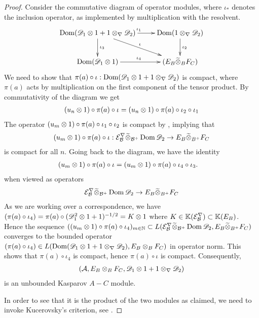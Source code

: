 \begin{proof}
	Consider the commutative diagram of operator modules, where $\iota_*$ denotes the inclusion operator, as implemented by multiplication with the resolvent.  
	\begin{align*}
		\xymatrix{
			\dom(\D_1\tens 1 +1\tens_{\nabla} \D_2) \ar[r]^{\iota_1} \ar[rd]^{\iota} \ar[d]^{\iota_3} & \dom(1\tens_{\nabla} \D_2) \ar[d]^{\iota_2} \\
			\dom(\D_1\tens 1) \ar[r]^{\iota_4} & (E_{B}\optens_B F_C)
		}
	\end{align*}
	We need to show that $\pi(a)\circ \iota: \operatorname{Dom}(\mathscr{D}_1\otimes 1 +1\otimes_{\nabla} \mathscr{D}_2)$ is compact, where $\pi(a)$ acts by multiplication on the first component of the tensor product. 
	By commutativity of the diagram we get 
	\begin{align*}
		(u_n \otimes 1)\circ \pi(a)\circ \iota=(u_n\otimes 1)\circ \pi(a) \circ \iota_2\circ \iota_1
	\end{align*}
	The operator $(u_m\otimes 1)\circ \pi(a) \circ \iota_1\circ \iota_2$ is compact by , implying that
	\begin{align*}
	(u_m \otimes 1)\circ \pi(a)\circ \iota:\mathcal{E}^\nabla_{\mathcal{B}} \widetilde{\otimes}_{\mathcal{B}^+} \operatorname{Dom} \mathscr{D}_2 \to E_B\widetilde{\otimes}_{B^+} F_C 
	\end{align*}
	is compact for all $n$. 
	Going back to the diagram, we have the identity 
	\begin{align*}
		&(u_m\otimes 1)\circ \pi(a)\circ \iota=(u_m\otimes 1)\circ \pi(a) \circ \iota_4\circ \iota_3.
	\end{align*}
	when viewed as operators 
	\begin{align*}
		\mathcal{E}^\nabla_{\mathcal{B}}\widetilde{\otimes}_{\mathcal{B}^+} \operatorname{Dom} \mathscr{D}_2\to E_B\widetilde{\otimes}_{B^+} F_C
	\end{align*}
	As we are working over a correspondence, we have $(\pi(a)\circ \iota_4)=\pi(a)\circ (\mathscr{D}_1^2\otimes 1+1)^{-1/2}=K\otimes 1$ where $K\in \mathbb{K}(\mathcal{E}^\nabla_{\mathcal{B}})\subset \mathbb{K}(E_B)$. 
	Hence the sequence $((u_m\otimes 1)\circ \pi(a)\circ \iota_4)_{m\in \mathbb{N}}\subset L(\mathcal{E}^\nabla_{\mathcal{B}} \widetilde{\otimes}_{\mathcal{B}^+} \operatorname{Dom} \mathscr{D}_2,E_B\widetilde{\otimes}_{B^+} F_C)$ converges to the bounded operator $(\pi(a)\circ \iota_4)\in L(\operatorname{Dom}(\mathscr{D}_1\otimes 1+1\otimes_\nabla \mathscr{D}_2),E_B\otimes_B F_C)$ in operator norm. This shows that $\pi(a)\circ \iota_4$ is compact, hence $\pi(a)\circ \iota$ is compact.    
	Consequently, 
	\begin{align*}
		(\mathcal{A},E_B\otimes_B F_C, \mathscr{D}_1\otimes 1+1\otimes_\nabla \mathscr{D}_2)
	\end{align*}
	is an unbounded Kasparov $A-C$ module.
	
	In order to see that it is the product of the two modules as claimed, we need to invoke Kucerovsky's criterion, see . 
	

\end{proof}
